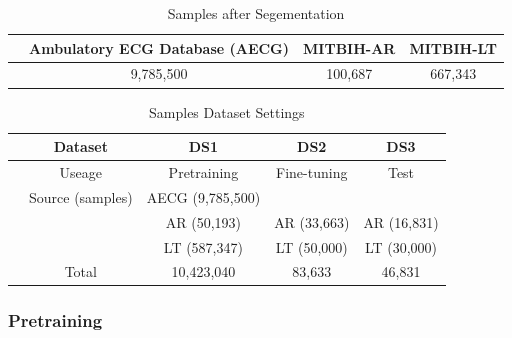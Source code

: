 \documentclass[journal]{IEEEtran}
\begin{document}
\begin{table}[!htbp]
\begin{center}
\begin{threeparttable}
\caption{Samples after Segementation}

\label{table2}
\begin{tabular}{cccc}
\hline
& Ambulatory ECG Database (AECG) & MITBIH-AR &  MITBIH-LT\\
\hline
& 9,785,500 & 100,687 &  667,343 \\
\hline
\end{tabular}

\end{threeparttable}

\end{center}
     \end{table}
     
     \begin{table}[!htbp]
\begin{center}
\begin{threeparttable}
\caption{Samples Dataset Settings}
\label{table3}
\begin{tabular}{ccccc}
\hline
& Dataset & DS1& DS2 &  DS3\\
\hline
& Useage & Pretraining & Fine-tuning & Test \\
\hline
& Source (samples) & AECG (9,785,500)   &  &   \\
&  & AR (50,193) & AR (33,663) & AR (16,831) \\
& & LT (587,347)& LT (50,000) & LT (30,000) \\
\hline
&Total & 10,423,040 & 83,633 & 46,831 \\
\hline
\end{tabular}
\end{threeparttable}
\end{center}
\end{table}

\subsubsection{Pretraining}
\end{document}
